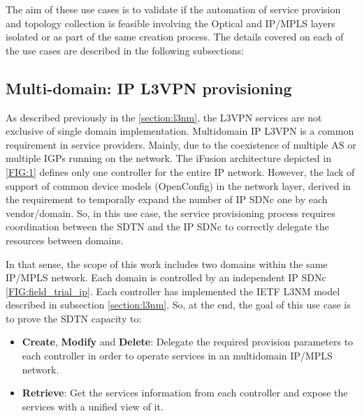 \documentclass[a4paper,fleqn]{cas-dc}
\begin{document}
The aim of these use cases is to validate if the automation of service provision and topology collection is feasible involving the Optical and IP/MPLS layers isolated or as part of the same creation process. The details covered on each of the use cases are described in the following subsections:

\subsection{Multi-domain: IP L3VPN provisioning}
\label{section:muli-l3nm}

As described previously in the \cref{section:l3nm}, the L3VPN services are not exclusive of single domain implementation. Multidomain IP L3VPN is a common requirement in service providers. Mainly, due to the coexistence of multiple AS or multiple IGPs running on the network. The iFusion architecture depicted in \ref{FIG:1} defines only one controller for the entire IP network. However, the lack of support of common device models (OpenConfig) in the network layer, derived in the requirement to temporally expand the number of IP SDNc one by each vendor/domain. So, in this use case, the service provisioning process requires coordination between the SDTN and the IP SDNc to correctly delegate the resources between domains.

In that sense, the scope of this work includes two domains within the same IP/MPLS network. Each domain is controlled by an independent IP SDNc \ref{FIG:field_trial_ip}. Each controller has implemented the IETF L3NM model described in subsection \cref{section:l3nm}. So, at the end, the goal of this use case is to prove the SDTN capacity to:
\begin{itemize}
    \item \textbf{Create}, \textbf{Modify} and \textbf{Delete}: Delegate the required provision parameters to each controller in order to operate services in an multidomain IP/MPLS network.
    \item \textbf{Retrieve}: Get the services information from each controller and expose the services with a unified view of it.
\end{itemize}
\end{document}
